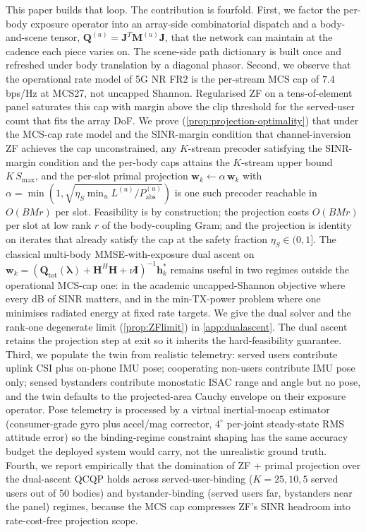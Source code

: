 \documentclass[journal,twocolumn,10pt]{IEEEtran}
\theoremstyle{plain}
\theoremstyle{remark}
\newcommand{\hh}{\mathbf{h}}
\newcommand{\ww}{\mathbf{w}}
\newcommand{\Pabs}{P_{\mathrm{abs}}}
\newcommand{\Qmat}{\mathbf{Q}}
\newcommand{\Mmat}{\mathbf{M}}
\newcommand{\Jmat}{\mathbf{J}}
\begin{document}
This paper builds that loop. The contribution is fourfold. First,
we factor the per-body exposure operator into an array-side
combinatorial dispatch and a body-and-scene tensor,
$\Qmat^{(u)} = \Jmat^T \Mmat^{(u)} \Jmat$, that the network can
maintain at the cadence each piece varies on. The scene-side path
dictionary is built once and refreshed under body translation by a
diagonal phasor. Second, we observe that the operational rate model
of 5G NR FR2 is the per-stream MCS cap of $7.4\,$bps/Hz at MCS27,
not uncapped Shannon. Regularised ZF on a tens-of-element panel
saturates this cap with margin above the clip threshold for the served-user count
that fits the array DoF. We prove
(\cref{prop:projection-optimality}) that under the MCS-cap rate
model and the SINR-margin condition that channel-inversion ZF
achieves the cap unconstrained, any $K$-stream precoder satisfying
the SINR-margin condition and the per-body caps attains the
$K$-stream upper bound $K\,S_{\max}$, and the per-slot primal
projection $\ww_k \leftarrow \alpha\,\ww_k$ with
$\alpha = \min(1, \sqrt{\eta_S \min_u L^{(u)}/\Pabs^{(u)}})$ is one
such precoder reachable in $O(B M r)$ per slot. Feasibility is by construction; the
projection costs $O(B M r)$ per slot at low rank $r$ of the
body-coupling Gram; and the projection is identity on iterates that
already satisfy the cap at the safety fraction $\eta_S \in (0, 1]$.
The classical multi-body MMSE-with-exposure dual ascent on $\ww_k
= (\Qmat_{\mathrm{tot}}(\bm\lambda) + \mathbf{H}^H \mathbf{H} + \nu
\mathbf{I})^{-1} \hh_k^*$ remains useful in two regimes outside the
operational MCS-cap one: in the academic uncapped-Shannon objective
where every dB of SINR matters, and in the min-TX-power problem
where one minimises radiated energy at fixed rate targets. We give
the dual solver and the rank-one degenerate limit
(\cref{prop:ZFlimit}) in \cref{app:dualascent}. The dual ascent
retains the projection step at exit so it inherits the
hard-feasibility guarantee. Third, we populate the twin from
realistic telemetry: served users contribute uplink CSI plus
on-phone IMU pose; cooperating non-users contribute IMU pose only;
sensed bystanders contribute monostatic ISAC range and angle but no
pose, and the twin defaults to the projected-area Cauchy envelope
on their exposure operator. Pose telemetry is processed by a
virtual inertial-mocap estimator (consumer-grade gyro plus
accel/mag corrector, $4^\circ$ per-joint steady-state RMS attitude
error) so the binding-regime constraint shaping has the same
accuracy budget the deployed system would carry, not the
unrealistic ground truth. Fourth, we report empirically that the
domination of ZF + primal projection over the dual-ascent QCQP
holds across served-user-binding ($K = 25, 10, 5$ served users out
of 50 bodies) and bystander-binding (served users far, bystanders
near the panel) regimes, because the MCS cap compresses ZF's SINR
headroom into rate-cost-free projection scope.
\end{document}

